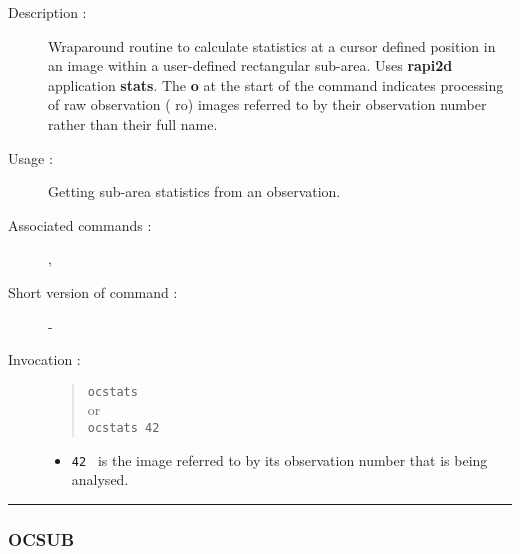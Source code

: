 \begin{description}

\item[Description :] Wraparound routine to calculate statistics at a
cursor defined position in an image within a user-defined rectangular
sub-area.  Uses {\bf rapi2d} application {\bf stats}. The {\bf o} at
the start of the command indicates processing of raw observation ({\sc
ro}) images referred to by their observation number rather than their
full name.

\item[Usage :] Getting sub-area statistics from an observation.
\item[Associated commands :] {\tt {}},
{\tt {}}
\item[Short version of command :] -
\item[Invocation :]

\begin{quote}{\tt  ocstats }\\
or \\
{\tt ocstats 42 }
\end{quote}

\begin{itemize}

\item {\tt 42 } is the image referred to by its observation number that
 is being analysed.
\end{itemize}

\end{description}

\hrule
\subsubsection*{\label{OCSUB}OCSUB}

